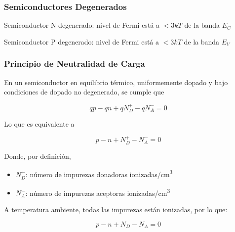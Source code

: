 \documentclass[10pt,t,aspectratio=169]{beamer}
\begin{document}
\begin{frame}[t]
  \frametitle{Semiconductores Degenerados}

  Semiconductor N degenerado: nivel de Fermi está a $<3kT$ de la banda $E_C$


  \begin{figure}[H]
    \centering
  \end{figure}

  Semiconductor P degenerado: nivel de Fermi está a $<3kT$ de la banda $E_V$

  \begin{figure}[H]
    \centering
  \end{figure}
\end{frame}


\begin{frame}[t]
  \frametitle{Principio de Neutralidad de Carga}

  En un semiconductor en equilibrio térmico, uniformemente dopado y bajo condiciones de dopado no degenerado, se cumple que

  \[ qp - qn + qN_D^+ - qN_A^- = 0 \]

  Lo que es equivalente a

  \[ p - n + N_D^+ - N_A^- = 0 \]

Donde, por definición,

\begin{itemize}
  \item $N_D^+$: número de impurezas donadoras ionizadas/cm\textsuperscript{3}
  \item $N_A^-$: número de impurezas aceptoras ionizadas/cm\textsuperscript{3}
\end{itemize}

\vspace{3mm}
A temperatura ambiente, todas las impurezas están ionizadas, por lo que:

\[ p - n + N_D - N_A = 0 \]
\end{frame}
\end{document}
